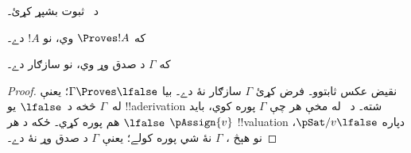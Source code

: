 \documentclass[../../../include/open-logic-section]{subfiles}
\begin{document}
\begin{prob}
  د~ ثبوت بشپړ کړئ۔
\end{prob}
\tagendprob

\begin{cor}
که $\Proves !A$ وي، نو $!A$  دے۔
\end{cor}

\begin{cor}
که $\Gamma$ د صدق وړ وي، نو سازګار دے۔
\end{cor}

\begin{proof}
نقيض عکس ثابتوو۔ فرض کړئ $\Gamma$ سازګار نۀ دے۔ بيا
$\Gamma \Proves \lfalse$؛ يعنې له~$\Gamma$ څخه د~$\lfalse$ يو
!!a{derivation} شته۔ د~ له مخې هر
چې $\Gamma$ پوره کوي، بايد $\lfalse$ هم پوره کړي۔ ځکه د هر
{$\pAssign{v}$ !!{valuation} دپاره $\pSat/{v}{\lfalse}$}، نو هېڅ
، $\Gamma$ نۀ شي پوره
کولے؛ يعنې $\Gamma$ د صدق وړ نۀ دے۔
\end{proof}
\end{document}
